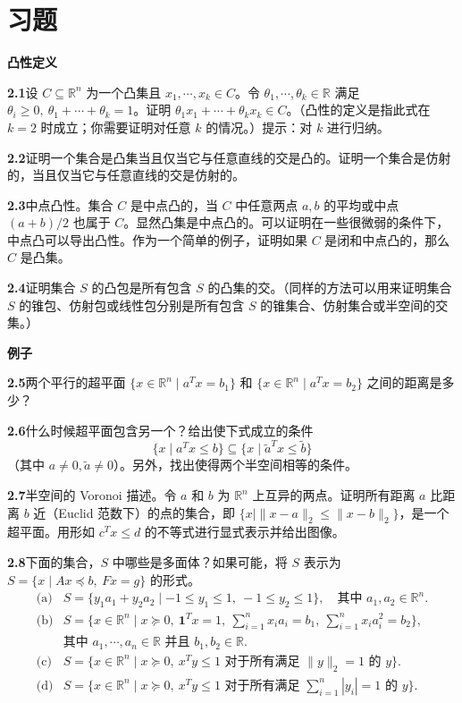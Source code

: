 \documentclass[UTF8,12pt,a4paper,fontset=fandol]{ctexart}
\begin{document}
\section*{习题}

\noindent\textbf{凸性定义}

\noindent\textbf{2.1}\quad 设 $C\subseteq\mathbb{R}^n$ 为一个凸集且 $x_1,\cdots,x_k\in C$。令 $\theta_1,\cdots,\theta_k\in\mathbb{R}$ 满足 $\theta_i\ge0,\ \theta_1+\cdots+\theta_k=1$。证明 $\theta_1x_1+\cdots+\theta_kx_k\in C$。（凸性的定义是指此式在 $k=2$ 时成立；你需要证明对任意 $k$ 的情况。）提示：对 $k$ 进行归纳。

\noindent\textbf{2.2}\quad 证明一个集合是凸集当且仅当它与任意直线的交是凸的。证明一个集合是仿射的，当且仅当它与任意直线的交是仿射的。

\noindent\textbf{2.3}\quad 中点凸性。集合 $C$ 是中点凸的，当 $C$ 中任意两点 $a,b$ 的平均或中点 $(a+b)/2$ 也属于 $C$。显然凸集是中点凸的。可以证明在一些很微弱的条件下，中点凸可以导出凸性。作为一个简单的例子，证明如果 $C$ 是闭和中点凸的，那么 $C$ 是凸集。

\noindent\textbf{2.4}\quad 证明集合 $S$ 的凸包是所有包含 $S$ 的凸集的交。（同样的方法可以用来证明集合 $S$ 的锥包、仿射包或线性包分别是所有包含 $S$ 的锥集合、仿射集合或半空间的交集。）

\noindent\textbf{例子}

\noindent\textbf{2.5}\quad 两个平行的超平面 $\{x\in\mathbb{R}^n\mid a^Tx=b_1\}$ 和 $\{x\in\mathbb{R}^n\mid a^Tx=b_2\}$ 之间的距离是多少？

\noindent\textbf{2.6}\quad 什么时候超平面包含另一个？给出使下式成立的条件
\[
  \{x\mid a^Tx\le b\}\subseteq\{x\mid \tilde{a}^Tx\le \tilde{b}\}
\]
（其中 $a\ne0,\tilde{a}\ne0$）。另外，找出使得两个半空间相等的条件。

\noindent\textbf{2.7}\quad 半空间的 Voronoi 描述。令 $a$ 和 $b$ 为 $\mathbb{R}^n$ 上互异的两点。证明所有距离 $a$ 比距离 $b$ 近（Euclid 范数下）的点的集合，即 $\{x\mid \|x-a\|_2\le\|x-b\|_2\}$，是一个超平面。用形如 $c^Tx\le d$ 的不等式进行显式表示并给出图像。

\noindent\textbf{2.8}\quad 下面的集合，$S$ 中哪些是多面体？如果可能，将 $S$ 表示为 $S=\{x\mid Ax\preceq b,\ Fx=g\}$ 的形式。
\[
  \begin{array}{ll}
  \text{(a)} & S=\{y_1a_1+y_2a_2\mid -1\le y_1\le1,\ -1\le y_2\le1\},\quad \text{其中 }a_1,a_2\in\mathbb{R}^n.\\[0.4em]
  \text{(b)} & S=\{x\in\mathbb{R}^n\mid x\succeq0,\ \mathbf{1}^Tx=1,\ \sum_{i=1}^n x_ia_i=b_1,\ \sum_{i=1}^n x_ia_i^2=b_2\},\\
  & \text{其中 }a_1,\cdots,a_n\in\mathbb{R}\text{ 并且 }b_1,b_2\in\mathbb{R}.\\[0.4em]
  \text{(c)} & S=\{x\in\mathbb{R}^n\mid x\succeq0,\ x^Ty\le1\text{ 对于所有满足 }\|y\|_2=1\text{ 的 }y\}.\\[0.4em]
  \text{(d)} & S=\{x\in\mathbb{R}^n\mid x\succeq0,\ x^Ty\le1\text{ 对于所有满足 }\sum_{i=1}^n |y_i|=1\text{ 的 }y\}.
  \end{array}
\]
\end{document}
